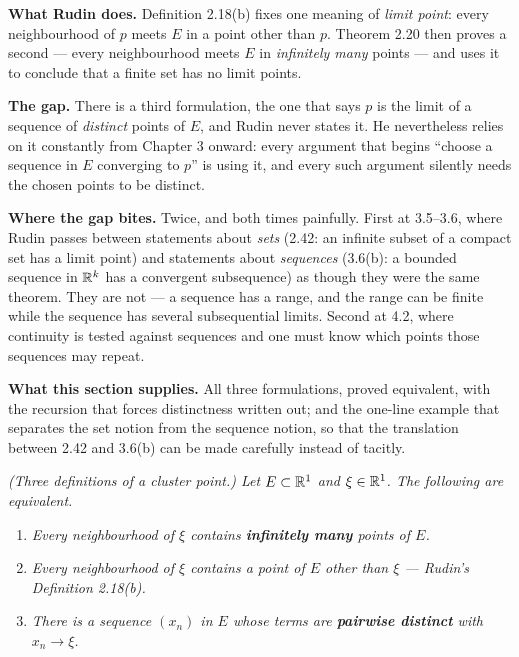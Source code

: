 
\begin{roadmap}
\raggedright
\textbf{What Rudin does.} Definition 2.18(b) fixes one meaning of
\emph{limit point}: every neighbourhood of $p$ meets $E$ in a point other
than $p$. Theorem 2.20 then proves a second --- every neighbourhood meets
$E$ in \emph{infinitely many} points --- and uses it to conclude that a
finite set has no limit points.

\smallskip
\textbf{The gap.} There is a third formulation, the one that says $p$ is the
limit of a sequence of \emph{distinct} points of $E$, and Rudin never states
it. He nevertheless relies on it constantly from Chapter 3 onward: every
argument that begins ``choose a sequence in $E$ converging to $p$'' is using
it, and every such argument silently needs the chosen points to be distinct.

\smallskip
\textbf{Where the gap bites.} Twice, and both times painfully. First at
3.5--3.6, where Rudin passes between statements about \emph{sets} (2.42:
an infinite subset of a compact set has a limit point) and statements about
\emph{sequences} (3.6(b): a bounded sequence in $\mathbb{R}^k$ has a convergent
subsequence) as though they were the same theorem. They are not --- a
sequence has a range, and the range can be finite while the sequence has
several subsequential limits. Second at 4.2, where continuity is tested
against sequences and one must know which points those sequences may repeat.

\smallskip
\textbf{What this section supplies.} All three formulations, proved
equivalent, with the recursion that forces distinctness written out; and the
one-line example that separates the set notion from the sequence notion, so
that the translation between 2.42 and 3.6(b) can be made carefully instead
of tacitly.
\end{roadmap}

\emph{(Three definitions of a cluster point.) Let $E \subset \mathbb{R}^1$ and
$\xi \in \mathbb{R}^1$. The following are equivalent.}
\begin{enumerate}[label=(\alph*), leftmargin=2.2em, itemsep=2pt, topsep=3pt]
  \item \emph{Every neighbourhood of $\xi$ contains \textbf{infinitely many}
        points of $E$.}
  \item \emph{Every neighbourhood of $\xi$ contains a point of $E$ other than
        $\xi$ --- Rudin's Definition 2.18(b).}
  \item \emph{There is a sequence $(x_n)$ in $E$ whose terms are
        \textbf{pairwise distinct} with $x_n \to \xi$.}
\end{enumerate}

